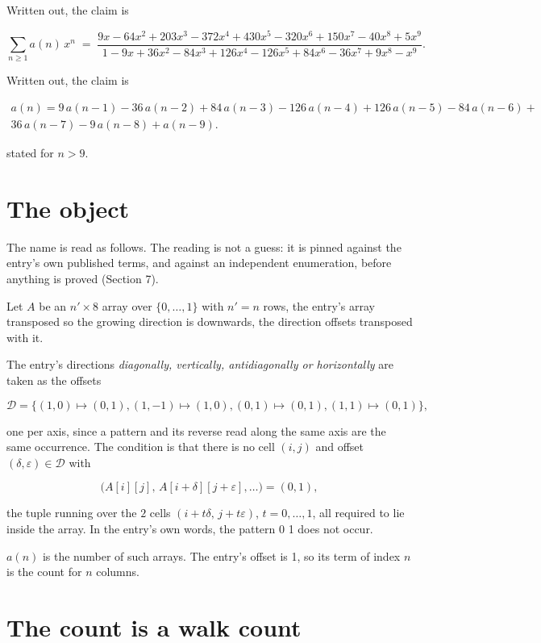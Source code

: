 \documentclass[11pt]{article}
\theoremstyle{definition}
\begin{document}
Written out, the claim is

\[\sum_{n \ge 1} a(n)\,x^n \;=\; \frac{9x - 64x^{2} + 203x^{3} - 372x^{4} + 430x^{5} - 320x^{6} + 150x^{7} - 40x^{8} + 5x^{9}}{1 - 9x + 36x^{2} - 84x^{3} + 126x^{4} - 126x^{5} + 84x^{6} - 36x^{7} + 9x^{8} - x^{9}}.\]

Written out, the claim is

\begin{multline*} a(n) = 9\,a(n-1) - 36\,a(n-2) + 84\,a(n-3) - 126\,a(n-4) + 126\,a(n-5) - 84\,a(n-6) + \\ 36\,a(n-7) - 9\,a(n-8) + a(n-9). \end{multline*}

stated for $n > 9$.

\section{The object}

The name is read as follows. The reading is not a guess: it is pinned against the entry's own published terms, and against an independent enumeration, before anything is proved (Section 7).

Let $A$ be an $n' \times 8$ array over $\{0,\dots,1\}$ with $n' = n$ rows, the entry's array transposed so the growing direction is downwards, the direction offsets transposed with it.

The entry's directions {\itshape diagonally, vertically, antidiagonally or horizontally} are taken as the offsets

\[\mathcal{D} = \{(1,0)\mapsto(0,1), (1,-1)\mapsto(1,0), (0,1)\mapsto(0,1), (1,1)\mapsto(0,1)\},\]

one per axis, since a pattern and its reverse read along the same axis are the same occurrence. The condition is that there is no cell $(i,j)$ and offset $(\delta,\varepsilon)\in\mathcal{D}$ with

\[\bigl(A[i][j],\,A[i{+}\delta][j{+}\varepsilon],\dots\bigr) = (0, 1),\]

the tuple running over the $2$ cells $(i+t\delta,\,j+t\varepsilon)$, $t = 0,\dots,1$, all required to lie inside the array. In the entry's own words, the pattern 0 1 does not occur.

$a(n)$ is the number of such arrays. The entry's offset is 1, so its term of index $n$ is the count for $n$ columns.

\section{The count is a walk count}
\end{document}
